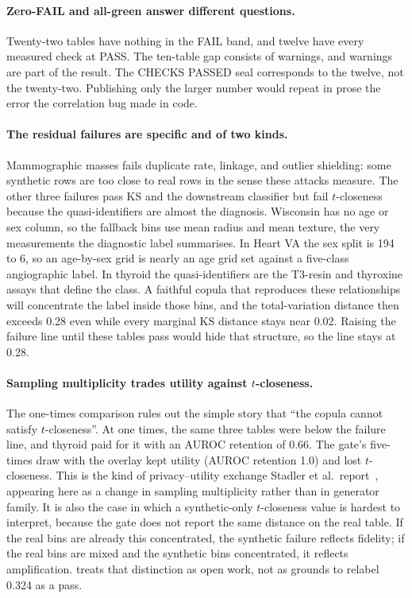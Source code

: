 \documentclass[11pt,a4paper]{article}
\begin{document}
\paragraph{Zero-FAIL and all-green answer different questions.}
Twenty-two tables have nothing in the FAIL band, and twelve have every measured check at PASS. The ten-table gap consists of warnings, and warnings are part of the result. The CHECKS PASSED seal corresponds to the twelve, not the twenty-two. Publishing only the larger number would repeat in prose the error the correlation bug made in code.

\paragraph{The residual failures are specific and of two kinds.}
Mammographic masses fails duplicate rate, linkage, and outlier shielding: some synthetic rows are too close to real rows in the sense these attacks measure. The other three failures pass KS and the downstream classifier but fail $t$-closeness because the quasi-identifiers are almost the diagnosis. Wisconsin has no age or sex column, so the fallback bins use mean radius and mean texture, the very measurements the diagnostic label summarises. In Heart VA the sex split is 194 to 6, so an age-by-sex grid is nearly an age grid set against a five-class angiographic label. In thyroid the quasi-identifiers are the T3-resin and thyroxine assays that define the class. A faithful copula that reproduces these relationships will concentrate the label inside those bins, and the total-variation distance then exceeds 0.28 even while every marginal KS distance stays near 0.02. Raising the failure line until these tables pass would hide that structure, so the line stays at 0.28.

\paragraph{Sampling multiplicity trades utility against $t$-closeness.}
The one-times comparison rules out the simple story that ``the copula cannot satisfy $t$-closeness''. At one times, the same three tables were below the failure line, and thyroid paid for it with an AUROC retention of 0.66. The gate's five-times draw with the overlay kept utility (AUROC retention 1.0) and lost $t$-closeness. This is the kind of privacy--utility exchange Stadler et al.\ report~\cite{stadler2022}, appearing here as a change in sampling multiplicity rather than in generator family. It is also the case in which a synthetic-only $t$-closeness value is hardest to interpret, because the gate does not report the same distance on the real table. If the real bins are already this concentrated, the synthetic failure reflects fidelity; if the real bins are mixed and the synthetic bins concentrated, it reflects amplification.  treats that distinction as open work, not as grounds to relabel 0.324 as a pass.
\end{document}
